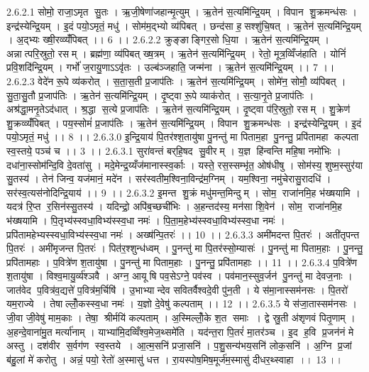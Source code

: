 2.6.2.1
सोमो॒ राजा॒ऽमृत॑ सु॒तः । ऋ॒जी॒षेणा॑जहान्मृ॒त्युम् । ऋ॒तेन॑ स॒त्यमि॑न्द्रि॒यम् । विपान॑ शु॒क्रमन्ध॑सः । इन्द्र॑स्येन्द्रि॒यम् । इ॒दं पयो॒ऽमृतं॒ मधु॑ । सोम॑म॒द्भ्यो व्य॑पिबत् । छन्द॑सा ह॒॒सश्शु॑चि॒षत् । ऋ॒तेन॑ स॒त्यमि॑न्द्रि॒यम् । अ॒द्भ्यः ख्षी॒रव्व्यँ॑पिबत् ।। 6 ।।
2.6.2.2
क्रुङ्ङाङ्गिर॒सो धि॒या । ऋ॒तेन॑ स॒त्यमि॑न्द्रि॒यम् । अन्नात्परि॒स्रुतो॒ रसम् । ब्रह्म॑णा॒ व्य॑पिबत् ख्ष॒त्रम् । ऋ॒तेन॑ स॒त्यमि॑न्द्रि॒यम् । रेतो॒ मूत्र॒व्विँज॑हाति । योनिं॑ प्रवि॒शदि॑न्द्रि॒यम् । गर्भो॑ ज॒रायु॒णाऽऽवृ॑तः । उल्ब॑ञ्जहाति॒ जन्म॑ना । ऋ॒तेन॑ स॒त्यमि॑न्द्रि॒यम् ।। 7 ।।
2.6.2.3
वेदे॑न रू॒पे व्य॑करोत् । स॒ता॒स॒ती प्र॒जाप॑तिः । ऋ॒तेन॑ स॒त्यमि॑न्द्रि॒यम् । सोमे॑न॒ सोमौ॒ व्य॑पिबत् । सु॒ता॒सु॒तौ प्र॒जाप॑तिः । ऋ॒तेन॑ स॒त्यमि॑न्द्रि॒यम् । दृ॒ष्ट्वा रू॒पे व्याक॑रोत् । स॒त्या॒नृ॒ते प्र॒जाप॑तिः । अश्र॑द्धा॒मनृ॒तेऽद॑धात् । श्र॒द्धा स॒त्ये प्र॒जाप॑तिः । ऋ॒तेन॑ स॒त्यमि॑न्द्रि॒यम् । दृ॒ष्ट्वा प॑रि॒स्रुतो॒ रसम् । शु॒क्रेण॑ शु॒क्रव्व्यँ॑पिबत् । पय॒स्सोमं॑ प्र॒जाप॑तिः । ऋ॒तेन॑ स॒त्यमि॑न्द्रि॒यम् । विपान॑ शु॒क्रमन्ध॑सः । इन्द्र॑स्येन्द्रि॒यम् । इ॒दं पयो॒ऽमृतं॒ मधु॑ ।। 8 ।।
2.6.3.0
इ॒न्द्रि॒याय॑ पि॒तर॑श्श॒तायु॑षा पु॒नन्तु॑ मा पिताम॒हा पु॒नन्तु॒ प्रपि॑तामहा कल्पता स्व॒स्तये॒ पञ्च॑ च ।। 3 ।।
2.6.3.1
सुरा॑वन्तं बर्‌हि॒षद॑ सु॒वीरम् । य॒ज्ञ हि॑न्वन्ति महि॒षा नमो॑भिः । दधा॑ना॒स्सोम॑न्दि॒वि दे॒वता॑सु । मदे॒मेन्द्र॒य्यँज॑मानास्स्व॒र्काः । यस्ते॒ रस॒स्सम्भृ॑त॒ ओष॑धीषु । सोम॑स्य॒ शुष्म॒स्सुर॑या सु॒तस्य॑ । तेन॑ जिन्व॒ यज॑मानं॒ मदे॑न । सर॑स्वतीम॒श्विना॒विन्द्र॑म॒ग्निम् । यम॒श्विना॒ नमु॑चेरासु॒रादधि॑ । सर॑स्व॒त्यस॑नोदिन्द्रि॒याय॑ ।। 9 ।।
2.6.3.2
इ॒मन्त शु॒क्रं मधु॑मन्त॒मिन्दुम् । सोम॒॒ राजा॑नमि॒ह भ॑ख्षयामि । यदत्र॑ रि॒प्त र॒सिन॑स्सु॒तस्य॑ । यदिन्द्रो॒ अपि॑ब॒च्छची॑भिः । अ॒हन्तद॑स्य॒ मन॑सा शि॒वेन॑ । सोम॒॒ राजा॑नमि॒ह भ॑ख्षयामि । पि॒तृभ्य॑स्स्वधा॒विभ्य॑स्स्व॒धा नमः॑ । पि॒ता॒म॒हेभ्य॑स्स्वधा॒विभ्य॑स्स्व॒धा नमः॑ । प्रपि॑तामहेभ्यस्स्वधा॒विभ्य॑स्स्व॒धा नमः॑ । अख्ष॑न्पि॒तरः॑ ।। 10 ।।
2.6.3.3
अमी॑मदन्त पि॒तरः॑ । अती॑तृपन्त पि॒तरः॑ । अमी॑मृजन्त पि॒तरः॑ । पित॑र॒श्शुन्ध॑ध्वम् । पु॒नन्तु॑ मा पि॒तर॑स्सो॒म्यासः॑ । पु॒नन्तु॑ मा पिताम॒हाः । पु॒नन्तु॒ प्रपि॑तामहाः । प॒वित्रे॑ण श॒तायु॑षा । पु॒नन्तु॑ मा पिताम॒हाः । पु॒नन्तु॒ प्रपि॑तामहाः ।। 11 ।।
2.6.3.4
प॒वित्रे॑ण श॒तायु॑षा । विश्व॒मायु॒र्व्य॑श्ञवै । अग्न॒ आयू॑षि पव॒सेऽग्ने॒ पव॑स्व । पव॑मान॒स्सुव॒र्जन॑ पु॒नन्तु॑ मा देवज॒नाः । जात॑वेद प॒वित्र॑व॒द्यत्ते॑ प॒वित्र॑म॒र्चिषि॑ । उ॒भाभ्यान्देव सवितर्वैश्वदे॒वी पु॑न॒ती । ये स॑मा॒नास्सम॑नसः । पि॒तरो॑ यम॒राज्ये । तेषाल्लोँ॒कस्स्व॒धा नमः॑ । य॒ज्ञो दे॒वेषु॑ कल्पताम् ।। 12 ।।
2.6.3.5
ये स॑जा॒तास्सम॑नसः । जी॒वा जी॒वेषु॑ माम॒काः । तेषा॒॒ श्रीर्मयि॑ कल्पताम् । अ॒स्मिल्लोँ॒के श॒त समाः । द्वे स्रु॒ती अ॑शृणवं पितृ॒णाम् । अ॒हन्दे॒वाना॑मु॒त मर्त्या॑नाम् । याभ्या॑मि॒दव्विँश्व॒मेज॒थ्समे॑ति । यद॑न्त॒रा पि॒तरं॑ मा॒तर॑ञ्च । इ॒द ह॒वि प्र॒जन॑नं मे अस्तु । दश॑वीर स॒र्वग॑ण स्व॒स्तये । आ॒त्म॒सनि॑ प्रजा॒सनि॑ । प॒शु॒सन्य॑भय॒सनि॑ लोक॒सनि॑ । अ॒ग्नि प्र॒जां ब॑हु॒लां मे॑ करोतु । अन्नं॒ पयो॒ रेतो॑ अ॒स्मासु॑ धत्त । रा॒यस्पोष॒मिष॒मूर्ज॑म॒स्मासु॑ दीधर॒थ्स्वाहा ।। 13 ।।

